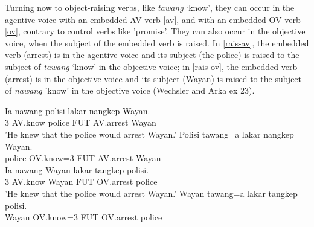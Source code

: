 \documentclass[output=paper
	        ,collection
	        ,collectionchapter
 	        ,biblatex
                ,babelshorthands
                ,newtxmath
                ,draftmode
                ,colorlinks, citecolor=brown
]{langscibook}
\begin{document}
\eal
{}
\zl


Turning now to object-raising verbs, like \emph{tawang} `know',  they can occur in the agentive voice with an embedded AV verb \ref{av}, and with an embedded OV verb \ref{ov}, contrary to control verbs like 'promise'. 
They can also occur in the objective voice, when the subject of the embedded verb is raised.
In \ref{rais-av}, the embedded verb (arrest) is in the agentive voice and its subject (the police) is raised to the subject of \emph{tawang} `know' in the objective voice; in \ref{rais-ov}, the embedded verb (arrest) is in the objective voice and its subject (Wayan) is raised to the subject of \emph{nawang} 'know' in the objective voice (Wechsler and Arka ex 23).

\begin{exe}
\ex \begin{xlist}
\ex 
\gll
Ia nawang polisi lakar nangkep Wayan. \\
3 AV.know police FUT AV.arrest Wayan \\
\glt 'He knew that the police would arrest Wayan.' \label{av}
\ex
\label{rais-av} 
\gll Polisi tawang=a  lakar nangkep Wayan. \\
     police OV.know=3 FUT   AV.arrest Wayan\\

\ex
\gll Ia nawang Wayan lakar tangkep polisi. \\
     3 AV.know Wayan FUT OV.arrest police\\
\glt 'He knew that the police would arrest Wayan.' \label{ov}
\ex
\gll Wayan tawang=a lakar tangkep polisi. \\
     Wayan OV.know=3 FUT OV.arrest police\\ \label{rais-ov}
\end{xlist}
\end{exe}
\end{document}
